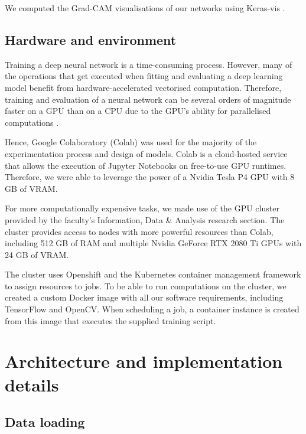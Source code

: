 \documentclass{l4proj}
\begin{document}
We computed the Grad-CAM visualisations of our networks using Keras-vis \citep{kotikalapudi_keras-vis_2017}.

\subsection{Hardware and environment}

Training a deep neural network is a time-consuming process. However, many of the operations that get executed when fitting and evaluating a deep learning model benefit from hardware-accelerated vectorised computation. Therefore, training and evaluation of a neural network can be several orders of magnitude faster on a GPU than on a CPU due to the GPU's ability for parallelised computations \citep{shi_benchmarking_2016}. 

Hence, Google Colaboratory (Colab) was used for the majority of the experimentation process and design of models. Colab is a cloud-hosted service that allows the execution of Jupyter Notebooks on free-to-use GPU runtimes. Therefore, we were able to leverage the power of a Nvidia Tesla P4 GPU with 8 GB of VRAM.

For more computationally expensive tasks, we made use of the GPU cluster provided by the faculty's Information, Data \& Analysis research section. The cluster provides access to nodes with more powerful resources than Colab, including 512 GB of RAM and multiple Nvidia GeForce RTX 2080 Ti GPUs with 24 GB of VRAM.

The cluster uses Openshift and the Kubernetes container management framework to assign resources to jobs. To be able to run computations on the cluster, we created a custom Docker image with all our software requirements, including TensorFlow and OpenCV. When scheduling a job, a container instance is created from this image that executes the supplied training script.


\section{Architecture and implementation details}

\subsection{Data loading}
\end{document}
